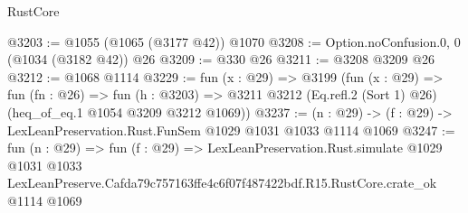 \begin{lexlean}{RustCore}
\begin{coremodule}
@3203 := @1055 (@1065 (@3177 @42)) @1070
@3208 := Option.noConfusion.{0, 0} (@1034 (@3182 @42)) @26
@3209 := @330 @26
@3211 := @3208 @3209 @26
@3212 := @1068 @1114
@3229 := fun (x : @29) =>
  @3199
    (fun (x : @29) =>
    fun (fn : @26) =>
    fun (h : @3203) =>
    @3211 @3212 (Eq.refl.{2} (Sort 1) @26) (heq_of_eq.{1} @1054 @3209 @3212 @1069))
@3237 := (n : @29) -> (f : @29) -> LexLeanPreservation.Rust.FunSem @1029 @1031 @1033 @1114 @1069
@3247 := fun (n : @29) =>
  fun (f : @29) =>
  LexLeanPreservation.Rust.simulate
    @1029
    @1031
    @1033
    LexLeanPreserve.Cafda79c757163ffe4c6f07f487422bdf.R15.RustCore.crate_ok
    @1114
    @1069
\end{coremodule}
\end{lexlean}
